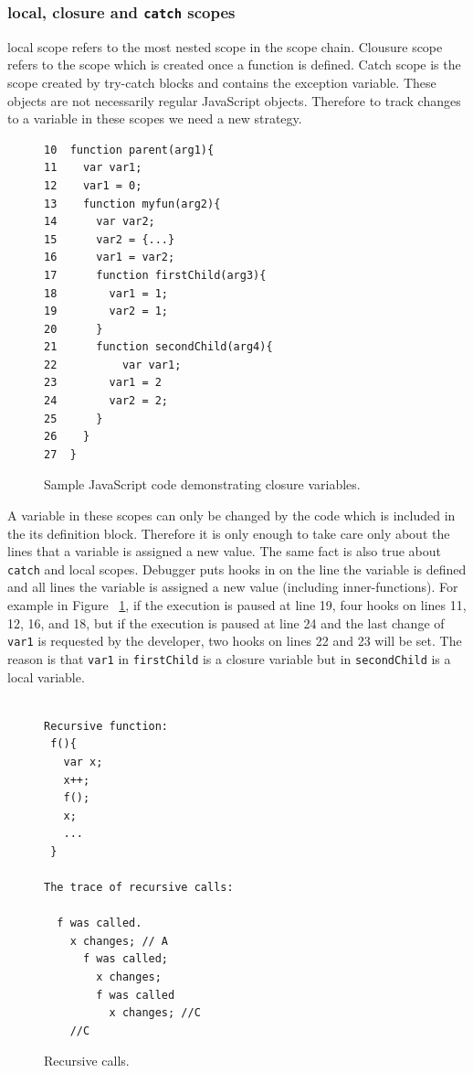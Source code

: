\documentclass[preprint]{sigplanconf}
\begin{document}
\subsubsection{local, closure and \texttt{catch} scopes}
local scope refers to the most nested scope in the scope chain. Clousure scope refers to the scope which is created once a function is defined. Catch scope is the scope created by try-catch blocks and contains the exception variable. These objects are not necessarily regular JavaScript objects. Therefore to track changes to a variable in these scopes we need a new strategy. 


\begin{figure}[htp]
\begin{verbatim}
10  function parent(arg1){
11    var var1;
12    var1 = 0;
13    function myfun(arg2){
14      var var2;
15      var2 = {...}
16      var1 = var2;
17      function firstChild(arg3){
18        var1 = 1;
19        var2 = 1;
20      }  
21      function secondChild(arg4){
22       	var var1;
23        var1 = 2			      
24        var2 = 2;	
25      }
26    }  
27  }    
\end{verbatim}
\caption{Sample JavaScript code demonstrating closure variables.}
\label{fig:js-closure}
\end{figure}

A variable in these scopes can only be changed by the code which is included in the its definition block. Therefore it is only enough to take care only about the lines that a variable is assigned a new value. The same fact is also true about \texttt{catch} and local scopes. Debugger puts hooks in on the line the variable is defined and all lines the variable is assigned a new value (including inner-functions). For example in Figure ~\ref{fig:js-closure}, if the execution is paused at line 19, four hooks on lines 11, 12, 16, and 18, but if the execution is paused at line 24 and the last change of \texttt{var1} is requested by the developer, two hooks on lines 22 and 23 will be set. The reason is that \texttt{var1} in \texttt{firstChild} is a closure variable but in \texttt{secondChild} is a local variable.

\begin{figure}[htp]
\begin{verbatim}

Recursive function: 
 f(){
   var x;
   x++;
   f();
   x; 
   ...
 }

The trace of recursive calls:

  f was called.
    x changes; // A
      f was called;
        x changes;
        f was called 
          x changes; //C
    //C 

\end{verbatim}
\caption{Recursive calls.}
\label{fig:recursive}
\end{figure}
\end{document}
